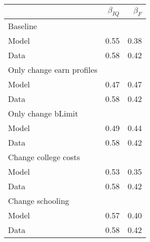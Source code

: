 \begin{tabular}{lrr}
\hline
  & $\beta_{IQ}$  & $\beta_{F}$  \\ 
\hline
Baseline &   &   \\ 
Model & 0.55  & 0.38  \\ 
Data & 0.58  & 0.42  \\ 
Only change earn profiles &   &   \\ 
Model & 0.47  & 0.47  \\ 
Data & 0.58  & 0.42  \\ 
Only change bLimit &   &   \\ 
Model & 0.49  & 0.44  \\ 
Data & 0.58  & 0.42  \\ 
Change college costs &   &   \\ 
Model & 0.53  & 0.35  \\ 
Data & 0.58  & 0.42  \\ 
Change schooling &   &   \\ 
Model & 0.57  & 0.40  \\ 
Data & 0.58  & 0.42  \\ 
\hline
\end{tabular}%
